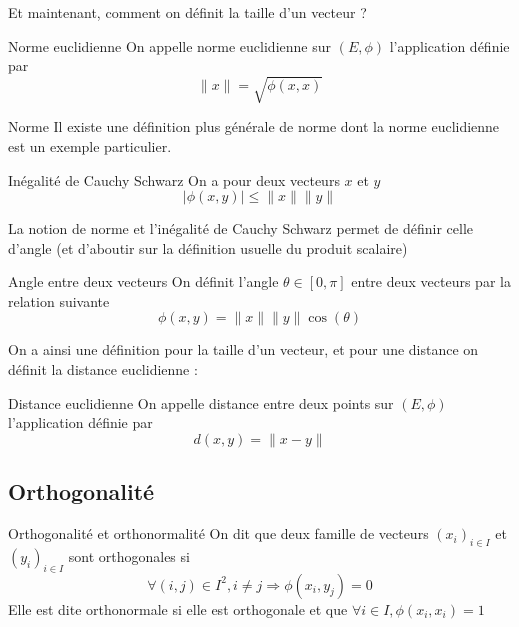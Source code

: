 \documentclass{classe}
\begin{document}

Et maintenant, comment on définit la taille d'un vecteur ?

\begin{définition}{Norme euclidienne}{}
On appelle norme euclidienne sur $(E, \phi)$ l'application définie par
\begin{equation*}
\|x\| = \sqrt{\phi(x, x)}
\end{equation*}
\end{définition}

\begin{remarque}{Norme}{}
Il existe une définition plus générale de norme dont la norme euclidienne est un exemple particulier.
\end{remarque}

\begin{théorème}{Inégalité de Cauchy Schwarz}{}
On a pour deux vecteurs $x$ et $y$
\begin{equation*}
|\phi(x, y)| \leq \|x\|\| y\|
\end{equation*}
\end{théorème}


La notion de norme et l'inégalité de Cauchy Schwarz permet de définir celle d'angle (et d'aboutir sur la définition usuelle du produit scalaire)
\begin{définition}{Angle entre deux vecteurs}{}
On définit l'angle $\theta \in [0, \pi]$ entre deux vecteurs par la relation suivante
\begin{equation*}
\phi(x, y) = \|x\|\|y\|\cos(\theta)
\end{equation*}
\end{définition}

On a ainsi une définition pour la taille d'un vecteur, et pour une distance on définit la distance euclidienne :

\begin{définition}{Distance euclidienne}{}
On appelle distance entre deux points sur $(E, \phi)$ l'application définie par
\begin{equation*}
d(x, y) = \|x-y\|
\end{equation*}
\end{définition}

\subsection{Orthogonalité}

\begin{définition}{Orthogonalité et orthonormalité}{}
On dit que deux famille de vecteurs $(x_i)_{i\in I}$ et $(y_i)_{i\in I}$ sont orthogonales si
\begin{equation*}
	\forall (i, j) \in I^2, i\neq j \Rightarrow \phi(x_i, y_j) = 0
\end{equation*}
Elle est dite orthonormale si elle est orthogonale et que $\forall i \in I, \phi(x_i, x_i) = 1$
\end{définition}
\end{document}
